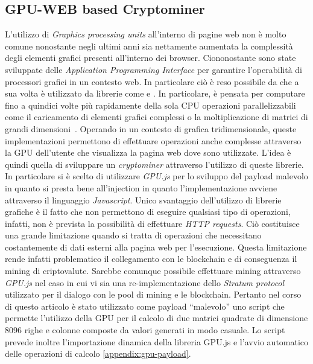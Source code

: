 \documentclass[conference, italian]{IEEEtran}
\begin{document}
\subsection{GPU-WEB based Cryptominer}\label{sec:gpu-web-based-cryptominer}
L'utilizzo di \emph{Graphics processing units} all'interno di pagine web non è molto comune nonostante negli ultimi anni sia nettamente aumentata la complessità degli elementi grafici presenti all'interno dei browser. Ciononostante sono state sviluppate delle \emph{Application Programming Interface} per garantire l'operabilità di processori grafici in un contesto web. In particolare ciò è reso possibile da  che a sua volta è utilizzato da librerie come  e . In particolare,  è pensata per computare fino a quindici volte più rapidamente della sola CPU operazioni parallelizzabili come il caricamento di elementi grafici complessi o la moltiplicazione di matrici di grandi dimensioni~\citep{banchmarkGPU.js}. Operando in un contesto di grafica tridimensionale, queste implementazioni permettono di effettuare operazioni anche complesse attraverso la GPU dell'utente che visualizza la pagina web dove sono utilizzate. L'idea è quindi quella di sviluppare un \emph{cryptominer} attraverso l'utilizzo di queste librerie. In particolare si è scelto di utilizzare \emph{GPU.js} per lo sviluppo del payload malevolo in quanto si presta bene all'injection in quanto l'implementazione avviene attraverso il linguaggio \emph{Javascript}. Unico svantaggio dell'utilizzo di librerie grafiche è il fatto che non permettono di eseguire qualsiasi tipo di operazioni, infatti, non è prevista la possibilità di effettuare \emph{HTTP requests}. Ciò costituisce una grande limitazione quando si tratta di operazioni che necessitano costantemente di dati esterni alla pagina web per l'esecuzione. Questa limitazione rende infatti problematico il collegamento con le blockchain e di conseguenza il mining di criptovalute. Sarebbe comunque possibile effettuare mining attraverso \emph{GPU.js} nel caso in cui vi sia una re-implementazione dello \emph{Stratum protocol} \cite{recabarren2017hardening} utilizzato per il dialogo con le pool di mining e le blockchain. Pertanto nel corso di questo articolo è stato utilizzato come payload ``malevolo'' uno script che permette l'utilizzo della GPU per il calcolo di due matrici quadrate di dimensione 8096 righe e colonne composte da valori generati in modo casuale. Lo script prevede inoltre l'importazione dinamica della libreria GPU.js e l'avvio automatico delle operazioni di calcolo \cref{appendix:gpu-payload}.
\end{document}
